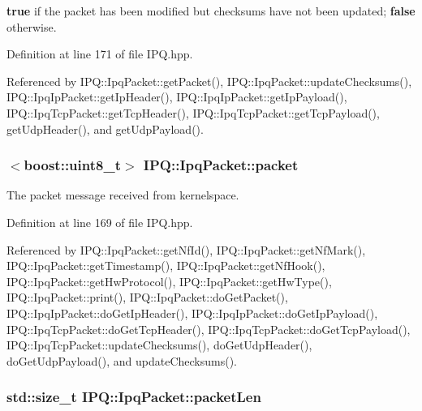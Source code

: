 {\bfseries true} if the packet has been modified but checksums have not been updated; {\bfseries false} otherwise. 



\-Definition at line 171 of file \-I\-P\-Q.\-hpp.



\-Referenced by \-I\-P\-Q\-::\-Ipq\-Packet\-::get\-Packet(), \-I\-P\-Q\-::\-Ipq\-Packet\-::update\-Checksums(), \-I\-P\-Q\-::\-Ipq\-Ip\-Packet\-::get\-Ip\-Header(), \-I\-P\-Q\-::\-Ipq\-Ip\-Packet\-::get\-Ip\-Payload(), \-I\-P\-Q\-::\-Ipq\-Tcp\-Packet\-::get\-Tcp\-Header(), \-I\-P\-Q\-::\-Ipq\-Tcp\-Packet\-::get\-Tcp\-Payload(), get\-Udp\-Header(), and get\-Udp\-Payload().

\hypertarget{classIPQ_1_1IpqPacket_a2bdf247f13a3e9f86e9e3846e6a9cb45}{
\subsubsection[{packet}]{$<$boost\-::uint8\-\_\-t$>$ {\bf \-I\-P\-Q\-::\-Ipq\-Packet\-::packet}}}
\label{classIPQ_1_1IpqPacket_a2bdf247f13a3e9f86e9e3846e6a9cb45}


\-The packet message received from kernelspace. 



\-Definition at line 169 of file \-I\-P\-Q.\-hpp.



\-Referenced by \-I\-P\-Q\-::\-Ipq\-Packet\-::get\-Nf\-Id(), \-I\-P\-Q\-::\-Ipq\-Packet\-::get\-Nf\-Mark(), \-I\-P\-Q\-::\-Ipq\-Packet\-::get\-Timestamp(), \-I\-P\-Q\-::\-Ipq\-Packet\-::get\-Nf\-Hook(), \-I\-P\-Q\-::\-Ipq\-Packet\-::get\-Hw\-Protocol(), \-I\-P\-Q\-::\-Ipq\-Packet\-::get\-Hw\-Type(), \-I\-P\-Q\-::\-Ipq\-Packet\-::print(), \-I\-P\-Q\-::\-Ipq\-Packet\-::do\-Get\-Packet(), \-I\-P\-Q\-::\-Ipq\-Ip\-Packet\-::do\-Get\-Ip\-Header(), \-I\-P\-Q\-::\-Ipq\-Ip\-Packet\-::do\-Get\-Ip\-Payload(), \-I\-P\-Q\-::\-Ipq\-Tcp\-Packet\-::do\-Get\-Tcp\-Header(), \-I\-P\-Q\-::\-Ipq\-Tcp\-Packet\-::do\-Get\-Tcp\-Payload(), \-I\-P\-Q\-::\-Ipq\-Tcp\-Packet\-::update\-Checksums(), do\-Get\-Udp\-Header(), do\-Get\-Udp\-Payload(), and update\-Checksums().

\hypertarget{classIPQ_1_1IpqPacket_a9b448a070c5ae499e32d2af5a190b86d}{
\subsubsection[{packet\-Len}]{\setlength{\rightskip}{0pt plus 5cm}std\-::size\-\_\-t {\bf \-I\-P\-Q\-::\-Ipq\-Packet\-::packet\-Len}}}
\label{classIPQ_1_1IpqPacket_a9b448a070c5ae499e32d2af5a190b86d}


